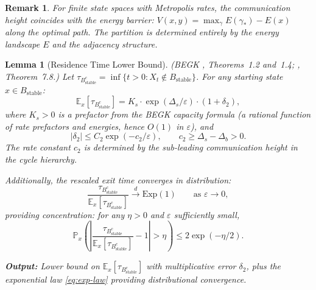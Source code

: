\documentclass[11pt]{article}
\newtheorem{lemma}[theorem]{Lemma}
\newtheorem{remark}[theorem]{Remark}
\newcommand{\eps}{\varepsilon}
\newcommand{\Ds}{\Delta_s}
\newcommand{\Db}{\Delta_b}
\newcommand{\Bstable}{B_{\mathrm{stable}}}
\begin{document}
\begin{remark}
For finite state spaces with Metropolis rates, the communication
height coincides with the energy barrier:
$V(x,y) = \max_\gamma E(\gamma_*) - E(x)$ along the optimal path.
The partition is determined entirely by the energy landscape $E$ and
the adjacency structure.
\end{remark}

\begin{lemma}[Residence Time Lower Bound]\label{lem:residence}
\textnormal{(BEGK \cite{BEGK02}, Theorems~1.2 and~1.4;
\cite{BdH15}, Theorem~7.8.)}
Let $\tau_{\Bstable^c} = \inf\{t > 0 : X_t \notin \Bstable\}$.
For any starting state $x \in \Bstable$:
\begin{equation}\label{eq:mean-exit}
  \mathbb{E}_x[\tau_{\Bstable^c}]
  = K_s \cdot \exp(\Ds / \eps) \cdot (1 + \delta_2),
\end{equation}
where $K_s > 0$ is a prefactor from the BEGK capacity formula
(a rational function of rate prefactors and energies, hence $O(1)$
in $\eps$), and
\begin{equation}\label{eq:delta2}
  |\delta_2| \leq C_2 \exp(-c_2 / \eps),
  \qquad c_2 \geq \Ds - \Db > 0.
\end{equation}
The rate constant $c_2$ is determined by the sub-leading communication
height in the cycle hierarchy.

Additionally, the rescaled exit time converges in distribution:
\begin{equation}\label{eq:exp-law}
  \frac{\tau_{\Bstable^c}}{\mathbb{E}_x[\tau_{\Bstable^c}]}
  \xrightarrow{d} \mathrm{Exp}(1)
  \qquad \text{as } \eps \to 0,
\end{equation}
providing concentration:
for any $\eta > 0$ and $\eps$ sufficiently small,
\begin{equation}\label{eq:exp-concentration}
  \mathbb{P}_x\!\left(
    \left|\frac{\tau_{\Bstable^c}}
              {\mathbb{E}_x[\tau_{\Bstable^c}]} - 1\right|
    > \eta
  \right)
  \leq 2\exp(-\eta/2).
\end{equation}

\medskip\noindent
\textbf{Output:} Lower bound on $\mathbb{E}_x[\tau_{\Bstable^c}]$
with multiplicative error $\delta_2$, plus the exponential law
\eqref{eq:exp-law} providing distributional convergence.
\end{lemma}
\end{document}
